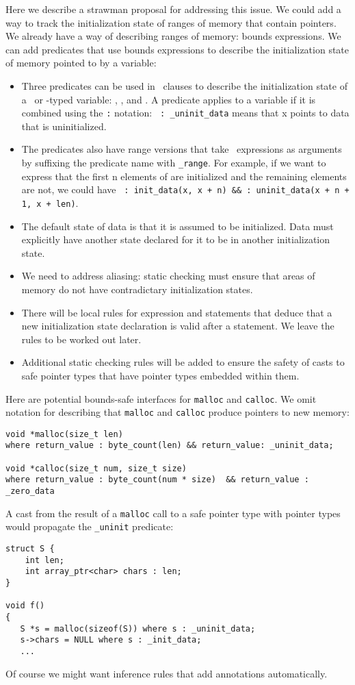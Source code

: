 Here we describe a strawman proposal for addressing this issue.  
We could add a way to track the initialization state of ranges of memory 
that contain pointers. We already have a way of 
describing ranges of memory: bounds expressions.  We can add
predicates that use bounds expressions to describe the initialization
state of memory pointed to by a variable:
\begin{itemize}
\item Three predicates can be used in \ clauses
to describe the initialization state of a \arrayptr\ or \ptr-typed variable:
, , and .
A predicate applies to a variable if it is combined using the \texttt{:}
notation: \texttt{ : \_uninit\_data} means that x points to data
that is uninitialized.
\item The predicates also have range versions that take \bounds\ expressions
as arguments by suffixing the predicate name with \texttt{\_range}.  For example, 
if we want to express that  the first n elements of are initialized
and the remaining elements are not, we could have
\texttt{ : init\_data(x, x + n)
\&\&  : uninit\_data(x + n + 1, x + len)}.
\item The default state of data is that it is assumed to be initialized.
Data must explicitly have another state declared for it to be in another
initialization state.
\item We need to address aliasing: static checking must ensure
that areas of memory do not have contradictary initialization states.
\item There will be local rules for expression and statements that deduce that a new
initialization state declaration is valid after a statement.  We leave 
the rules to be worked out later.
\item Additional static checking rules will be added to ensure the
safety of casts to safe pointer types that have pointer types embedded
within them.
\end{itemize}

Here are potential bounds-safe interfaces for \texttt{malloc} and \texttt{calloc}.
We omit notation for describing that \texttt{malloc} and \texttt{calloc} produce 
pointers to new memory:
\begin{verbatim}
void *malloc(size_t len) 
where return_value : byte_count(len) && return_value: _uninit_data;

void *calloc(size_t num, size_t size)
where return_value : byte_count(num * size)  && return_value : _zero_data
\end{verbatim}
A cast from the result of a \texttt{malloc} call to a safe pointer type with pointer types
would propagate the  \texttt{\_uninit} predicate:
\begin{verbatim}
struct S {
    int len;
    int array_ptr<char> chars : len;
}

void f() 
{
   S *s = malloc(sizeof(S)) where s : _uninit_data;
   s->chars = NULL where s : _init_data;
   ...
\end{verbatim}
Of course we might want inference rules that add annotations automatically.  

